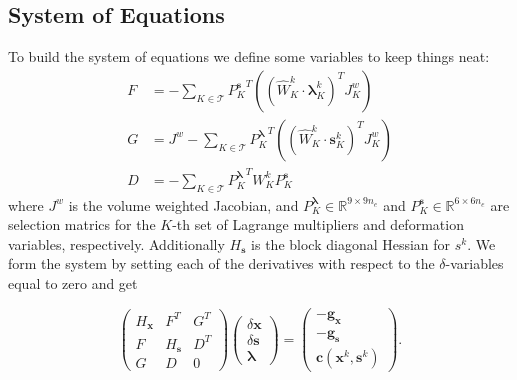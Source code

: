 \documentclass[letterpaper,12pt]{article}
\theoremstyle{remark}
\newcommand{\R}{\mathbb{R}}
\newcommand{\Th}{\mathcal{T}}
\newcommand{\x}{\mathbf{x}}
\newcommand{\C}{\mathbf{c}}
\newcommand{\s}{\mathbf{s}}
\newcommand{\la}{\mathbf{\lambda}}
\newcommand{\dx}{\delta \x}
\newcommand{\ds}{\delta \s}
\newcommand{\Hx}{ {H_\x} }
\newcommand{\Hs}{ {H_\s} }
\newcommand{\gx}{ {\mathbf{g}_\x} }
\newcommand{\gs}{ {\mathbf{g}_\s} }
\begin{document}
\subsection{System of Equations}
To build the system of equations we define some variables to keep things neat:
\begin{align}
F &= - \sum_{K \in \Th} {P_K^\s}^T \left((\hat{W}_K^{k}\cdot \la_K^k)^T J_K^w \right) \\
G &= J^w - \sum_{K \in \Th} {P_K^\la}^T \left((\hat{W}_K^{k}\cdot \s_K^k)^T J_K^w \right) \\
D &= -\sum_{K \in \Th} {P_K^\la}^T  W_K^k P_K^\s
\end{align}
where $J^w$ is the volume weighted Jacobian, and $P_K^\la \in \R^{9 \times 9n_e}$ and $P_K^\s \in \R^{6 \times 6n_e}$ are selection matrics for the $K$-th set of Lagrange multipliers and deformation variables, respectively. Additionally $\Hs$ is the block diagonal Hessian for $s^k$. We form the system by setting each of the derivatives with respect to the $\delta$-variables equal to zero and get

\begin{equation}
\begin{pmatrix}
\Hx & F^T & G^T \\
F & \Hs & D^T\\
G & D & 0
\end{pmatrix}
\begin{pmatrix}
\dx \\
\ds \\
\la
\end{pmatrix} =
\begin{pmatrix}
-\gx \\
-\gs \\
\C (\x^k, \s^k)
\end{pmatrix}.
\end{equation}
\end{document}
